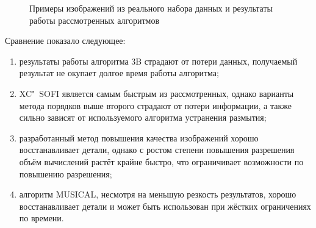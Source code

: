 \begin{figure}[ht]
	\caption{Примеры изображений из реального набора данных и результаты работы рассмотренных алгоритмов}
	\label{fig:blinking-results-real}
\end{figure}

Сравнение показало следующее:
\begin{enumerate}[beginpenalty=10000]
	\item результаты работы алгоритма 3B страдают от потери данных, получаемый результат не окупает долгое время работы алгоритма;
	\item XC"~SOFI является самым быстрым из рассмотренных, однако варианты метода порядков выше второго страдают от потери информации, а также сильно зависят от используемого алгоритма устранения размытия;
	\item разработанный метод повышения качества изображений хорошо восстанавливает детали, однако с ростом степени повышения разрешения объём вычислений растёт крайне быстро, что ограничивает возможности по повышению разрешения;
	\item алгоритм MUSICAL, несмотря на меньшую резкость результатов, хорошо восстанавливает детали и может быть использован при жёстких ограничениях по времени.
\end{enumerate}

